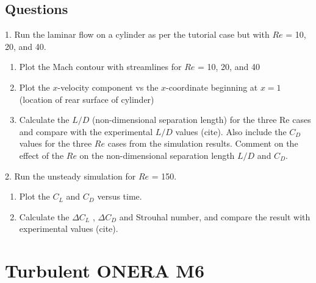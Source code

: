 \section{Questions}
1. Run the laminar flow on a cylinder as per the tutorial case but with $Re$ = 10, 20, and 40.
\begin{enumerate}[label=(\alph*)]
    \item Plot the Mach contour with streamlines for $Re$ = 10, 20, and 40
    \item Plot the $x$-velocity component vs the $x$-coordinate beginning at $x = 1$ (location of rear surface of cylinder)
    \item Calculate the $L/D$ (non-dimensional separation length) for the three Re cases and compare with the experimental $L/D$ values (cite). Also include the $C_D$ values for the three $Re$ cases from the simulation results. Comment on the effect of the $Re$ on the non-dimensional separation length $L/D$ and $C_D$.
\end{enumerate}
2. Run the unsteady simulation for $Re$ = 150.
\begin{enumerate}[label=(\alph*)]
    \item Plot the $C_L$ and $C_D$ versus time.
    \item Calculate the $\Delta C_L$ , $\Delta C_D$ and Strouhal number, and compare the result with experimental values (cite).
\end{enumerate}
\chapter{Turbulent ONERA M6}
\label{ch:Turbulent ONERA M6}
